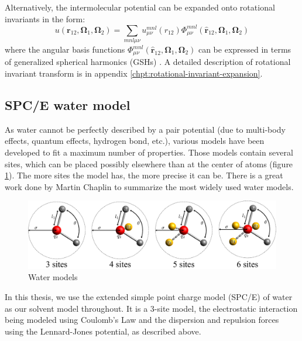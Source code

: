 Alternatively, the intermolecular potential can be expanded onto rotational
invariants in the form:
\begin{equation}
u(\mathbf{r}_{12},\mathbf{\Omega}_{1},\mathbf{\Omega}_{2})=\sum_{mnl\mu\nu}u_{\mu\nu}^{mnl}(r_{12})\Phi_{\mu\nu}^{mnl}(\hat{\mathbf{r}}_{12},\mathbf{\Omega}_{1},\mathbf{\Omega}_{2})
\end{equation}
where the angular basis functions $\Phi_{\mu\nu}^{mnl}(\hat{\mathbf{r}}_{12},\mathbf{\Omega}_{1},\mathbf{\Omega}_{2})$
can be expressed in terms of generalized spherical harmonics (\acs{GSH}s)
\citep{Gray-Gubbins}. A detailed description of rotational invariant
transform is in appendix \ref{chpt:rotational-invariant-expansion}.

\subsection{SPC/E water model}

As water cannot be perfectly described by a pair potential (due to
multi-body effects, quantum effects, hydrogen bond, etc.), various
models have been developed to fit a maximum number of properties.
Those models contain several sites, which can be placed possibly elsewhere
than at the center of atoms (figure \ref{fig:Water-models}). The
more sites the model has, the more precise it can be. There is a great
work done by Martin Chaplin \citep{water-model} to summarize the
most widely used water models.

\begin{figure}[h]
\begin{centering}
\includegraphics[width=0.85\columnwidth]{_figure/water}
\par\end{centering}
\caption{Water models\label{fig:Water-models}}
\end{figure}

In this thesis, we use the extended simple point charge model (SPC/E)
of water \citep{SPC/E} as our solvent model throughout.
It is a 3-site model, the electrostatic interaction being modeled
using Coulomb's Law and the dispersion and repulsion forces using
the Lennard-Jones potential, as described above. 

